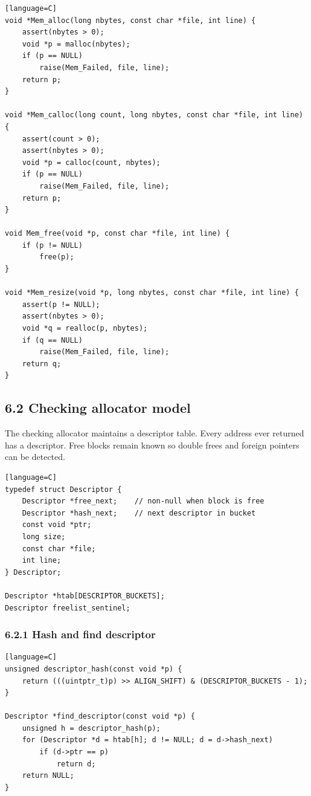 \documentclass[11pt]{article}
\begin{document}
\begin{verbatim}[language=C]
void *Mem_alloc(long nbytes, const char *file, int line) {
    assert(nbytes > 0);
    void *p = malloc(nbytes);
    if (p == NULL)
        raise(Mem_Failed, file, line);
    return p;
}

void *Mem_calloc(long count, long nbytes, const char *file, int line) {
    assert(count > 0);
    assert(nbytes > 0);
    void *p = calloc(count, nbytes);
    if (p == NULL)
        raise(Mem_Failed, file, line);
    return p;
}

void Mem_free(void *p, const char *file, int line) {
    if (p != NULL)
        free(p);
}

void *Mem_resize(void *p, long nbytes, const char *file, int line) {
    assert(p != NULL);
    assert(nbytes > 0);
    void *q = realloc(p, nbytes);
    if (q == NULL)
        raise(Mem_Failed, file, line);
    return q;
}
\end{verbatim}

\subsection{6.2 Checking allocator model}\label{checking-allocator-model}

The checking allocator maintains a descriptor table. Every address ever returned has a descriptor. Free blocks remain known so double frees and foreign pointers can be detected.

\begin{verbatim}[language=C]
typedef struct Descriptor {
    Descriptor *free_next;    // non-null when block is free
    Descriptor *hash_next;    // next descriptor in bucket
    const void *ptr;
    long size;
    const char *file;
    int line;
} Descriptor;

Descriptor *htab[DESCRIPTOR_BUCKETS];
Descriptor freelist_sentinel;
\end{verbatim}

\subsubsection{6.2.1 Hash and find descriptor}\label{hash-and-find-descriptor}

\begin{verbatim}[language=C]
unsigned descriptor_hash(const void *p) {
    return (((uintptr_t)p) >> ALIGN_SHIFT) & (DESCRIPTOR_BUCKETS - 1);
}

Descriptor *find_descriptor(const void *p) {
    unsigned h = descriptor_hash(p);
    for (Descriptor *d = htab[h]; d != NULL; d = d->hash_next)
        if (d->ptr == p)
            return d;
    return NULL;
}
\end{verbatim}
\end{document}
